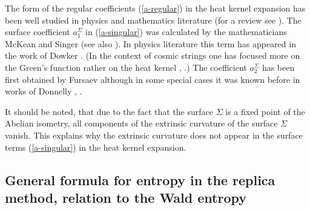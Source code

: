 \documentclass[12pt]{article}
\begin{document}
The form of the regular coefficients (\ref{a-regular}) in the heat kernel expansion has been well studied in  physics and mathematics literature (for a review see  \cite{Vassilevich:2003xt}). The  surface coefficient $a_1^\Sigma$ in (\ref{a-singular}) was calculated by the mathematicians McKean and Singer \cite{McKean-Singer} (see also \cite{Cheeger}). 
In  physics literature this term has appeared in the work of Dowker  \cite{Dowker:1977zj}. (In the context of cosmic strings  one has focused more on the Green's function  rather on the heat kernel  \cite{Allen:1990mm}, \cite{Frolov:1987dz}.)
The coefficient $a_2^\Sigma$
has been first obtained by Fursaev \cite{Fursaev:1994in} although  in some special cases it was known before  in works of Donnelly \cite{Donnelly-1}, \cite{Donnelly-2}.

It should be noted, that due to the fact that the surface $\Sigma$ is a fixed point of the Abelian isometry, all components of the extrinsic curvature of the surface $\Sigma$ vanish. This explains why the extrinsic curvature does not appear in the surface terms (\ref{a-singular}) in the heat kernel expansion. 



\subsection{General formula for  entropy in the replica method, relation to the Wald entropy} 
\end{document}
